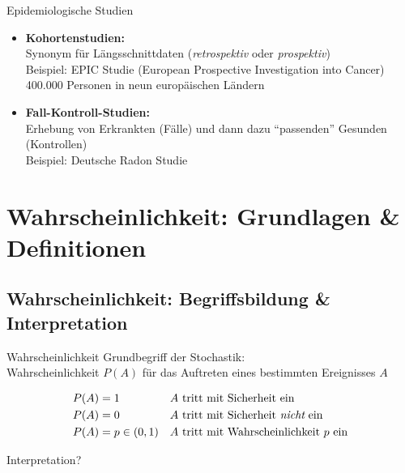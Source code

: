 \documentclass[
  10pt,
  ignorenonframetext,
]{beamer}
\begin{document}
\begin{frame}{Epidemiologische Studien}
\label{epidemiologische-studien}
\begin{itemize}
\item
  \textbf{Kohortenstudien:}\\
  Synonym für Längsschnittdaten (\emph{retrospektiv} oder
  \emph{prospektiv})\\
  Beispiel: EPIC Studie (European Prospective Investigation into Cancer)
  400.000 Personen in neun europäischen Ländern
\item
  \textbf{Fall-Kontroll-Studien:}\\
  Erhebung von Erkrankten (Fälle) und dann dazu ``passenden'' Gesunden
  (Kontrollen)\\
  Beispiel: Deutsche Radon Studie
\end{itemize}
\end{frame}

\section{Wahrscheinlichkeit: Grundlagen \&
Definitionen}\label{wahrscheinlichkeit-grundlagen-definitionen}

\subsection{Wahrscheinlichkeit: Begriffsbildung \&
Interpretation}\label{wahrscheinlichkeit-begriffsbildung-interpretation}

\begin{frame}{Wahrscheinlichkeit}
\label{wahrscheinlichkeit}
Grundbegriff der Stochastik:\\
Wahrscheinlichkeit \(P(A)\) für das Auftreten eines bestimmten
Ereignisses \(A\)

\begin{align*}
P(A) & =  1           &  & A \text{ tritt mit Sicherheit ein}\\
P(A) & =  0           &  & A \text{ tritt mit Sicherheit {\em nicht} ein}\\
P(A) & =  p \in (0,1) &  & A \text{ tritt mit Wahrscheinlichkeit $p$ ein}
\end{align*}

Interpretation?

\end{frame}
\end{document}
